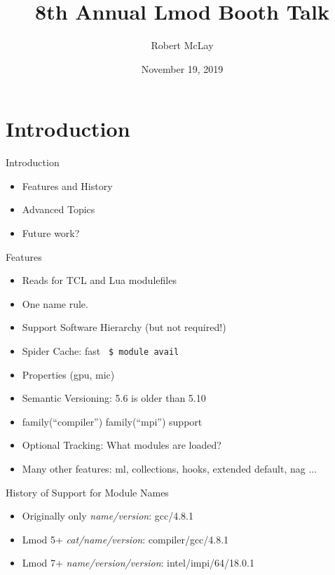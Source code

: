 \documentclass{beamer}
\begin{document}
\title[Lmod]{8th Annual Lmod Booth Talk}
\author{Robert McLay} 
\date{November 19, 2019} 

\frame{\titlepage} 

\section{Introduction}

\begin{frame}{Introduction}
  \begin{itemize}
    \item Features and History
    \item Advanced Topics
    \item Future work?
  \end{itemize}
\end{frame}

\begin{frame}{Features}
  \begin{itemize}
    \item Reads for TCL and Lua modulefiles
    \item One name rule.
    \item Support Software Hierarchy (but not required!)
    \item Spider Cache: fast \texttt{\color{blue} \$ module avail}
    \item Properties (gpu, mic)
    \item Semantic Versioning:  5.6 is older than 5.10
    \item family(``compiler'') family(``mpi'') support
    \item Optional Tracking: What modules are loaded?
    \item Many other features: ml, collections, hooks,
      extended default, nag ...
  \end{itemize}
\end{frame}

\begin{frame}{History of Support for Module Names}
  \begin{itemize}
    \item Originally only \emph{name/version}:  gcc/4.8.1
    \item Lmod 5+ \emph{cat/name/version}:  compiler/gcc/4.8.1
    \item Lmod 7+ \emph{name/version/version}: intel/impi/64/18.0.1
  \end{itemize}
\end{frame}
\end{document}
